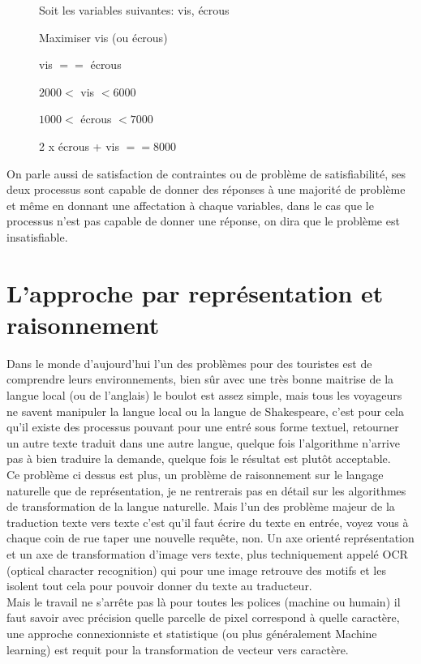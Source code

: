 \begin{description}
\item[] Soit les variables suivantes: vis, écrous
\item[] Maximiser vis (ou écrous)
\item[] vis $==$ écrous
\item[] $2000 <$ vis $< 6000$
\item[] $1000 <$ écrous $< 7000$
\item[] 2 x écrous + vis $== 8000$
\end{description}

On parle aussi de satisfaction de contraintes ou de problème de satisfiabilité, ses deux processus sont capable de donner des réponses à une majorité de problème et même en donnant une affectation à chaque variables, dans le cas que le processus n'est pas capable de donner une réponse, on dira que le problème est insatisfiable.

\pagebreak

\section{L'approche par représentation et raisonnement}

Dans le monde d'aujourd'hui l'un des problèmes pour des touristes est de comprendre leurs environnements, bien sûr avec une très bonne maitrise de la langue local (ou de l'anglais) le boulot est assez simple, mais tous les voyageurs ne savent manipuler la langue local ou la langue de Shakespeare, c'est pour cela qu'il existe des processus pouvant pour une entré sous forme textuel, retourner un autre texte traduit dans une autre langue, quelque fois l'algorithme n'arrive pas à bien traduire la demande, quelque fois le résultat est plutôt acceptable.\\
Ce problème ci dessus est plus, un problème de raisonnement sur le langage naturelle que de représentation, je ne rentrerais pas en détail sur les algorithmes de transformation de la langue naturelle. Mais l'un des problème majeur de la traduction texte vers texte c'est qu'il faut écrire du texte en entrée, voyez vous à chaque coin de rue taper une nouvelle requête, non. Un axe orienté représentation et un axe de transformation d'image vers texte, plus techniquement appelé OCR (optical character recognition) qui pour une image retrouve des motifs et les isolent tout cela pour pouvoir donner du texte au traducteur.\\
Mais le travail ne s'arrête pas là pour toutes les polices (machine ou humain) il faut savoir avec précision quelle parcelle de pixel correspond à quelle caractère, une approche connexionniste et statistique (ou plus généralement Machine learning) est requit pour la transformation de vecteur vers caractère.

\pagebreak

